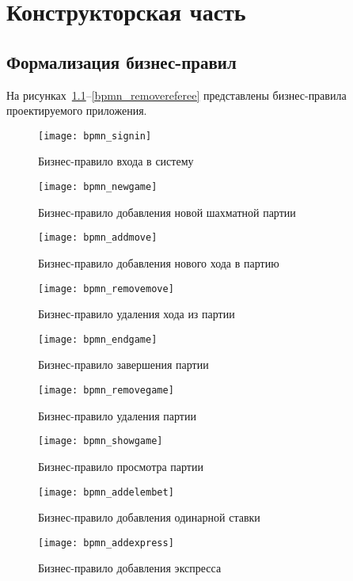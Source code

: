 \chapter{Конструкторская часть}

\section{Формализация бизнес-правил}

На рисунках~\ref{bpmn_signin}--\ref{bpmn_removereferee} представлены бизнес-правила проектируемого приложения.
\begin{figure}[H]
	\centering
	\texttt{[image: bpmn\_signin]}
	\caption{Бизнес-правило входа в систему}
	\label{bpmn_signin}
\end{figure}
\begin{figure}[H]
	\centering
	\texttt{[image: bpmn\_newgame]}
	\caption{Бизнес-правило добавления новой шахматной партии}
	\label{bpmn_newgame}
\end{figure}
\begin{figure}[H]
	\centering
	\texttt{[image: bpmn\_addmove]}
	\caption{Бизнес-правило добавления нового хода в партию}
	\label{bpmn_addmove}
\end{figure}
\begin{figure}[H]
	\centering
	\texttt{[image: bpmn\_removemove]}
	\caption{Бизнес-правило удаления хода из партии}
	\label{bpmn_removemove}
\end{figure}
\begin{figure}[H]
	\centering
	\texttt{[image: bpmn\_endgame]}
	\caption{Бизнес-правило завершения партии}
	\label{bpmn_endgame}
\end{figure}
\begin{figure}[H]
	\centering
	\texttt{[image: bpmn\_removegame]}
	\caption{Бизнес-правило удаления партии}
	\label{bpmn_removegame}
\end{figure}
\begin{figure}[H]
	\centering
	\texttt{[image: bpmn\_showgame]}
	\caption{Бизнес-правило просмотра партии}
	\label{bpmn_showgame}
\end{figure}
\begin{figure}[H]
	\centering
	\texttt{[image: bpmn\_addelembet]}
	\caption{Бизнес-правило добавления одинарной ставки}
	\label{bpmn_addelembet}
\end{figure}
\begin{figure}[H]
	\centering
	\texttt{[image: bpmn\_addexpress]}
	\caption{Бизнес-правило добавления экспресса}
	\label{bpmn_addexpress}
\end{figure}

